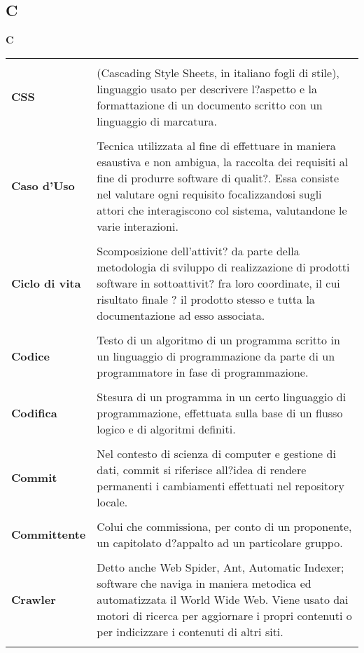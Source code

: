{\subsection{C} 
\hfill\Huge{\textbf{C}} \\ 
\normalsize 
\begin{longtabu} to 
\toprule \\ 
\textbf{CSS} & (Cascading Style Sheets, in italiano fogli di stile), linguaggio usato per descrivere l?aspetto e la formattazione di un documento scritto con un linguaggio di marcatura. \\ 
 \\ 
\textbf{Caso d'Uso} & Tecnica utilizzata al fine di effettuare in maniera esaustiva e non ambigua, la raccolta dei requisiti al fine di produrre software di qualit?. Essa consiste nel valutare ogni requisito focalizzandosi sugli attori che interagiscono col sistema, valutandone le varie interazioni. \\ 
 \\ 
\textbf{Ciclo di vita} & Scomposizione dell'attivit? da parte della metodologia di sviluppo di realizzazione di prodotti software in sottoattivit? fra loro coordinate, il cui risultato finale ? il prodotto stesso e tutta la documentazione ad esso associata. \\ 
 \\ 
\textbf{Codice} & Testo di un algoritmo di un programma scritto in un linguaggio di programmazione da parte di un programmatore in fase di programmazione. \\ 
 \\ 
\textbf{Codifica} & Stesura di un programma in un certo linguaggio di programmazione, effettuata sulla base di un flusso logico e di algoritmi definiti. \\ 
 \\ 
\textbf{Commit} & Nel contesto di scienza di computer e gestione di dati, commit si riferisce all?idea di rendere permanenti i cambiamenti effettuati nel repository locale. \\ 
 \\ 
\textbf{Committente} & Colui che commissiona, per conto di un proponente, un capitolato d?appalto ad un particolare gruppo. \\ 
 \\ 
\textbf{Crawler} & Detto anche Web Spider, Ant, Automatic Indexer; software che naviga in maniera metodica ed automatizzata il World Wide Web. Viene usato dai motori di ricerca per aggiornare i propri contenuti o per indicizzare i contenuti di altri siti. \\ 
 \\ 
\end{longtabu} 
\newpage 
}

